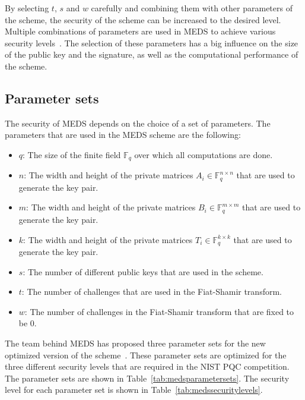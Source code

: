\documentclass[11pt,a4paper]{report}
\theoremstyle{definition}
\begin{document}
By selecting $t$, $s$ and $w$ carefully and combining them with other parameters of the scheme, the security of the scheme can be increased to the desired level. Multiple combinations of parameters are used in MEDS to achieve various security levels~\cite{chou2023meds}. The selection of these parameters has a big influence on the size of the public key and the signature, as well as the computational performance of the scheme.

\subsection{Parameter sets}
\label{sec:parametersets}
The security of MEDS depends on the choice of a set of parameters. The parameters that are used in the MEDS scheme are the following:
\begin{itemize}
  \item $q$: The size of the finite field $\mathbb{F}_q$ over which all computations are done.
  \item $n$: The width and height of the private matrices $A_i \in \mathbb{F}_q^{n \times n}$ that are used to generate the key pair.
  \item $m$: The width and height of the private matrices $B_i \in \mathbb{F}_q^{m \times m}$ that are used to generate the key pair.
  \item $k$: The width and height of the private matrices $T_i \in \mathbb{F}_q^{k \times k}$ that are used to generate the key pair.
  \item $s$: The number of different public keys that are used in the scheme.
  \item $t$: The number of challenges that are used in the Fiat-Shamir transform.
  \item $w$: The number of challenges in the Fiat-Shamir transform that are fixed to be 0.
\end{itemize}

The team behind MEDS has proposed three parameter sets for the new optimized version of the scheme~\cite{chou2024reducing}. These parameter sets are optimized for the three different security levels that are required in the NIST PQC competition. The parameter sets are shown in Table~\ref{tab:medsparametersets}. The security level for each parameter set is shown in Table~\ref{tab:medssecuritylevels}.
\end{document}
